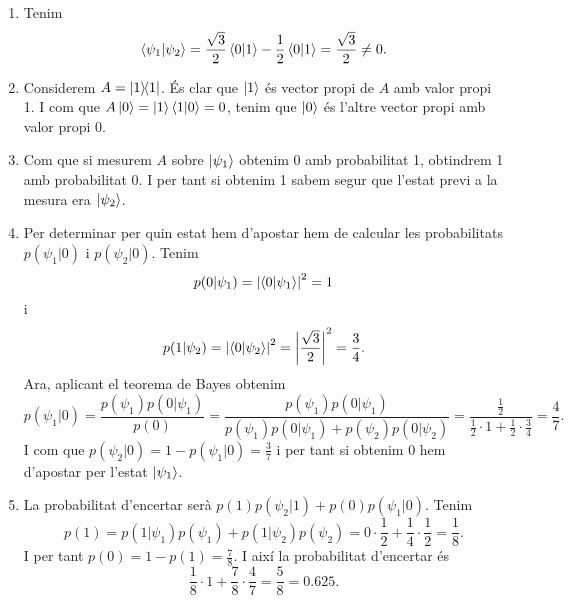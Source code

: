 \documentclass[12pt]{article}
\numberwithin{table}{section}
\numberwithin{figure}{section}
\numberwithin{equation}{section}
\newcommand{\proj}[1]{\ketbra{#1}{#1}}
\begin{document}
\begin{enumerate}[label=(\alph*), font=\bfseries \sffamily, wide, labelwidth=!, labelindent=0pt]
	\item Tenim
		\begin{equation*}
			\braket{\psi_1}{\psi_2} = \frac{\sqrt{3}}{2}\braket{0}{1} - \frac{1}{2}\braket{0}{1} = \frac{\sqrt{3}}{2} \neq 0.
		\end{equation*}
	\item Considerem \( A = \proj{1} \). És clar que \( \ket{1} \) és vector propi de \( A \) amb valor propi 1. I com que \( A\ket{0} = \ket{1}\braket{1}{0} = 0 \), tenim que \( \ket{0} \) és l'altre vector propi amb valor propi 0. 
	\item Com que si mesurem \( A \) sobre \( \ket{\psi_1} \) obtenim 0 amb probabilitat 1, obtindrem 1 amb probabilitat 0. I per tant si obtenim 1 sabem segur que l'estat previ a la mesura era \( \ket{\psi_2} \). 
	\item	Per determinar per quin estat hem d'apostar hem de calcular les probabilitats \( p(\psi_1 \vert 0) \) i \( p(\psi_2 \vert 0) \). Tenim
		\begin{equation*}
			p(0 \vert \psi_1) = \abs{\braket{0}{\psi_1}}^2 = 1
		\end{equation*}
		i
		\begin{equation*}
			p(1 \vert \psi_2) = \abs{\braket{0}{\psi_2}}^2 = \abs{\frac{\sqrt{3}}{2}}^2 = \frac{3}{4}. 
		\end{equation*}
		Ara, aplicant el teorema de Bayes obtenim
		\begin{equation*}
			p(\psi_1 \vert 0) = \frac{p(\psi_1) p(0 \vert \psi_1)}{p(0)} = \frac{p(\psi_1) p(0 \vert \psi_1)}{p(\psi_1)p(0 \vert \psi_1) + p(\psi_2) p(0 \vert \psi_2)} = \frac{\frac{1}{2}}{\frac{1}{2}\cdot 1 + \frac{1}{2} \cdot \frac{3}{4}} = \frac{4}{7}.
		\end{equation*}
		I com que \( p(\psi_2 \vert 0) = 1 - p(\psi_1 \vert 0) = \frac{3}{7} \) i per tant si obtenim 0 hem d'apostar per l'estat \( \ket{\psi_1} \). 
	\item La probabilitat d'encertar serà \( p(1)p(\psi_2 \vert 1) + p(0)p(\psi_1 \vert 0) \). Tenim 
		\begin{equation*}
			p(1) = p(1 \vert \psi_1)p(\psi_1) + p(1 \vert \psi_2)p(\psi_2) = 0 \cdot \frac{1}{2} + \frac{1}{4}\cdot \frac{1}{2} = \frac{1}{8}. 
		\end{equation*}
		I per tant \( p(0) = 1 - p(1) = \frac{7}{8} \). I així la probabilitat d'encertar és
		\begin{equation*}
			\frac{1}{8}\cdot 1 + \frac{7}{8}\cdot \frac{4}{7} = \frac{5}{8} = \num{0.625}. 
		\end{equation*}
\end{enumerate}
\end{document}
